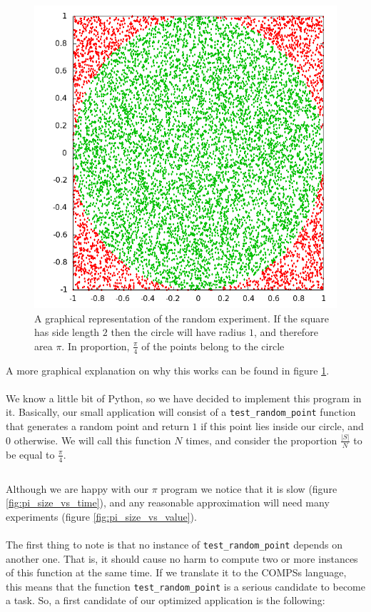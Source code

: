 \begin{figure}[ht!]
\centering
\includegraphics[scale=0.1]{figures/circle_square.png}
\caption{A graphical representation of the random experiment. If the square has side length $2$ then the circle will have radius $1$, and therefore area $\pi$. In proportion, $\frac{\pi}{4}$ of the points belong to the circle}
\label{fig:circle_square}
\end{figure}

A more graphical explanation on why this works can be found in figure \ref{fig:circle_square}.\\
\\
We know a little bit of Python, so we have decided to implement this program in it. Basically, our small application will consist of a \verb|test_random_point| function that generates a random point and return $1$ if this point lies inside our circle, and $0$ otherwise. We will call this function $N$ times, and consider the proportion $\frac{|S|}{N}$ to be equal to $\frac{\pi}{4}$.
\newpage
\inputminted{python}{applications/PI_SQUARE/sequential.py}
Although we are happy with our $\pi$ program we notice that it is slow (figure \ref{fig:pi_size_vs_time}), and any reasonable approximation will need many experiments (figure \ref{fig:pi_size_vs_value}).\\
\\
The first thing to note is that no instance of \verb|test_random_point| depends on another one. That is, it should cause no harm to compute two or more instances of this function at the same time. If we translate it to the COMPSs language, this means that the function \verb|test_random_point| is a serious candidate to become a task. So, a first candidate of our optimized application is the following:

